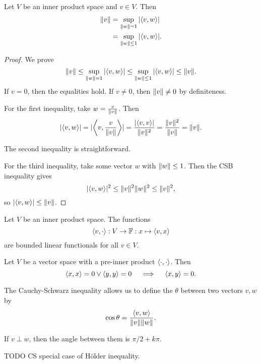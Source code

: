 \begin{corollary} \label{normVectorSupUnitvectors}
Let $V$ be an inner product space and $v\in V$. Then
\begin{align*}
\norm{v} &= \sup_{\norm{w} = 1}|\inner{v,w}| \\
&= \sup_{\norm{w} \leq 1}|\inner{v,w}|.
\end{align*}
\end{corollary}
\begin{proof}
We prove 
\[ \norm{v} \leq \sup_{\norm{w} = 1}|\inner{v,w}| \leq \sup_{\norm{w} \leq 1}|\inner{v,w}| \leq \norm{v}. \]
If $v = 0$, then the equalities hold. If $v\neq 0$, then $\lVert v\rVert \neq 0$ by definiteness.

For the first inequality, take $w = \frac{v}{\lVert v\rVert}$. Then
\[ |\inner{v,w}| = |\inner{v,\frac{v}{\norm{v}}}| = \frac{|\inner{v,v}|}{\norm{v}^2} = \frac{\norm{v}^2}{\norm{v}} = \norm{v}. \]

The second inequality is straightforward.

For the third inequality, take some vector $w$ with $\lVert w\rVert\leq 1$. Then the CSB inequality gives
\[ |\inner{v,w}|^2 \leq \norm{v}^2\norm{w}^2 \leq \norm{v}^2, \]
so $|\inner{v,w}| \leq \norm{v}$.
\end{proof}
\begin{corollary} \label{innerBoundedFunctionals}
Let $V$ be an inner product space. The functions
\[\inner{v,\cdot}: V\to \mathbb{F}: x\mapsto \inner{v,x} \]
are bounded linear functionals for all $v\in V$.
\end{corollary}
\begin{corollary} \label{preInnerProductCSBZero}
Let $V$ be a vector space with a pre-inner product $\inner{\cdot,\cdot}$. Then
\[ \inner{x,x}=0\lor\inner{y,y}=0 \quad\implies\quad \inner{x,y} = 0. \]
\end{corollary}
\begin{definition}
The Cauchy-Schwarz inequality allows us to define the  $\theta$ between two vectors $v,w$ by
\[ \cos\theta = \frac{\inner{v,w}}{\norm{v}\norm{w}}.\]
\end{definition}
\begin{lemma}
If $v\perp w$, then the angle between them is $\pi/2 + k\pi$.
\end{lemma}

TODO CS special case of Hölder inequality.

